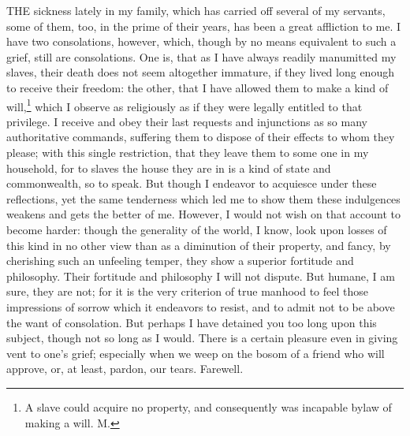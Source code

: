 THE sickness lately in my family, which has carried off several of my
servants, some of them, too, in the prime of their years, has been a great
affliction to me. I have two consolations, however, which, though by no
means equivalent to such a grief, still are consolations. One is, that as
I have always readily manumitted my slaves, their death does not seem
altogether immature, if they lived long enough to receive their freedom:
the other, that I have allowed them to make a kind of will,\footnote{A slave could acquire
no property, and consequently was incapable bylaw of making a will. M.}
which I observe as religiously as if they were legally entitled to that
privilege. I receive and obey their last requests and injunctions as so
many authoritative commands, suffering them to dispose of their effects to
whom they please; with this single restriction, that they leave them to
some one in my household, for to slaves the house they are in is a kind of
state and commonwealth, so to speak. But though I endeavor to acquiesce
under these reflections, yet the same tenderness which led me to show them
these indulgences weakens and gets the better of me. However, I would not
wish on that account to become harder: though the generality of the world,
I know, look upon losses of this kind in no other view than as a
diminution of their property, and fancy, by cherishing such an unfeeling
temper, they show a superior fortitude and philosophy. Their fortitude and
philosophy I will not dispute. But humane, I am sure, they are not; for it
is the very criterion of true manhood to feel those impressions of sorrow
which it endeavors to resist, and to admit not to be above the want of
consolation. But perhaps I have detained you too long upon this subject,
though not so long as I would. There is a certain pleasure even in giving
vent to one's grief; especially when we weep on the bosom of a friend who
will approve, or, at least, pardon, our tears. Farewell.



